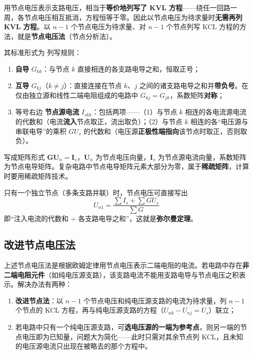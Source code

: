 用节点电压表示支路电压，相当于\textbf{等价地列写了 KVL 方程}——绕任一回路一周，各节点电压相互抵消，方程恒等于零。因此以节点电压为待求量时\textbf{无需再列 KVL 方程}。以 $n-1$ 个节点电压为待求量、对 $n-1$ 个节点列写 KCL 方程的方法，就是\textbf{节点电压法}（节点分析法）。

其标准形式为
列写规则：
\begin{enumerate}
  \item \textbf{自导} $G_{kk}$：与节点 $k$ 直接相连的各支路电导之和，恒取正号；
  \item \textbf{互导} $G_{kj}$（$k\neq j$）：直接连接在节点 $k$、$j$ 之间的诸支路电导之和并\textbf{带负号}。在仅由独立源和线性二端电阻组成的电路中 $G_{kj}=G_{jk}$，系数矩阵\textbf{对称}；
  \item 等号右边 \textbf{节点源电流} $I_{skk}$：包括两项——（1）与节点 $k$ 相连的各电流源电流的代数和（电流\textbf{流入}节点取正，流出取负）；（2）与节点 $k$ 相连的各“电压源与串联电导”的乘积 $G U_s$ 的代数和（电压源\textbf{正极性端指向}该节点时取正，否则取负）。
\end{enumerate}
写成矩阵形式 $\boldsymbol{GU}_n=\boldsymbol{I}_s$，$\boldsymbol{U}_n$ 为节点电压向量，$\boldsymbol{I}_s$ 为节点源电流向量，系数矩阵为节点电导矩阵。复杂电路中节点电导矩阵元素大部分为零，属于\textbf{稀疏矩阵}，计算时要用稀疏矩阵技术。

只有一个独立节点（多条支路并联）时，节点电压可直接写出
\begin{equation}
U_{n1}=\frac{\sum I_s+\sum GU_s}{\sum G}
\end{equation}
即“注入电流的代数和 ÷ 各支路电导之和”，这就是\textbf{弥尔曼定理}。

\subsection{改进节点电压法}
上述节点电压法是根据欧姆定律用节点电压表示二端电阻的电流。若电路中存在\textbf{非二端电阻元件}（如纯电压源支路），该支路电流不能用支路电导与节点电压之积表示。解决办法有两种：

\begin{enumerate}
  \item \textbf{改进节点法}：以 $n-1$ 个节点电压和纯电压源支路的电流为待求量，列 $n-1$ 个节点的 KCL 方程，再与纯电压源支路的方程（$U_{nk}-U_{nj}=U_s$）联立；
  \item 若电路中只有一个纯电压源支路，可\textbf{选电压源的一端为参考点}，则另一端的节点电压即为已知量，问题大为简化——此时只需对其余节点列 KCL，且未知的电压源电流只出现在被略去的那个方程中。
\end{enumerate}

